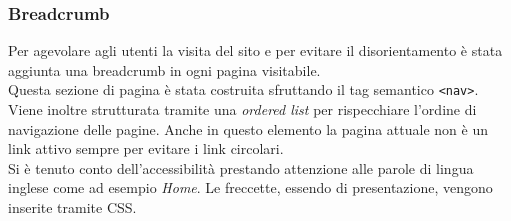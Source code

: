 \subsubsection{Breadcrumb}
Per agevolare agli utenti la visita del sito e per evitare il disorientamento è stata aggiunta una breadcrumb in ogni pagina visitabile.\\
Questa sezione di pagina è stata costruita sfruttando il tag semantico \texttt{<nav>}. Viene inoltre strutturata tramite una \textit{ordered list} per rispecchiare l'ordine di navigazione delle pagine. Anche in questo elemento la pagina attuale non è un link attivo sempre per evitare i link circolari.\\
Si è tenuto conto dell'accessibilità prestando attenzione alle parole di lingua inglese come ad esempio \textit{Home}. Le freccette, essendo di presentazione, vengono inserite tramite CSS.

